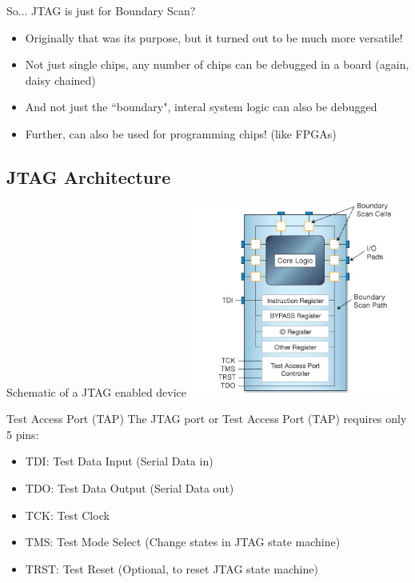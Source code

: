 \documentclass{beamer}
\begin{document}
\begin{frame}{So... JTAG is just for Boundary Scan?}
    \begin{itemize}
    \item Originally that was its purpose, but it turned out to be much more versatile!
    \item Not just single chips, any number of chips can be debugged in a board
        (again, daisy chained)
    \item And not just the ``boundary", interal system logic can also be debugged
    \item Further, can also be used for programming chips! (like FPGAs)
    \end{itemize}
\end{frame}

\subsection{JTAG Architecture}

\begin{frame}{Schematic of a JTAG enabled device}
    \includegraphics[width=7cm]{images/schematic_diagram_jtag_enab.jpg}
\end{frame}

\begin{frame}{Test Access Port (TAP)}
The JTAG port or Test Access Port (TAP) requires only 5 pins:
    \begin{itemize}
    \item TDI: Test Data Input (Serial Data in) 
    \item TDO: Test Data Output (Serial Data out)
    \item TCK: Test Clock
    \item TMS: Test Mode Select (Change states in JTAG state machine)
    \item TRST: Test Reset (Optional, to reset JTAG state machine)
    \end{itemize}
\end{frame}
\end{document}
